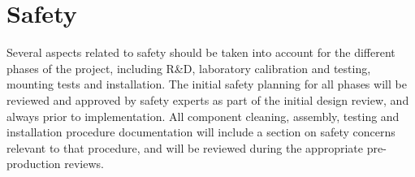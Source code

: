 \section{Safety}
\label{sec:fdgen-slow-cryo-safety}


Several aspects related to safety should be taken into account for the different phases of the  project, including R\&D, laboratory calibration and testing, mounting tests and installation. 
The initial safety planning for all phases will be reviewed and approved by safety experts as part of the initial design review, and always prior to implementation. 
All component cleaning, assembly, testing  and installation procedure documentation will include a section on safety concerns
relevant to that procedure, and will be reviewed during the appropriate pre-production reviews.

